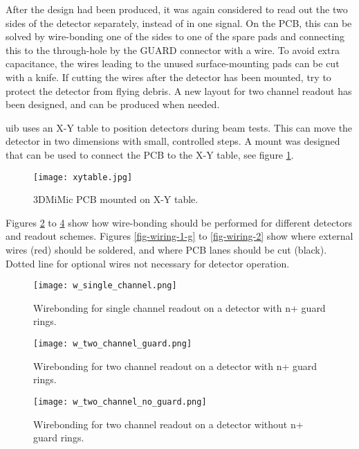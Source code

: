 \documentclass[../main/thesis.tex]{subfiles}
\begin{document}
After the design had been produced, it was again considered to read out the two sides of the detector separately, instead of in one signal. On the \gls{PCB}, this can be solved by wire-bonding one of the sides to one of the spare pads and connecting this to the through-hole by the GUARD connector with a wire. To avoid extra capacitance, the wires leading to the unused surface-mounting pads can be cut with a knife. If cutting the wires after the detector has been mounted, try to protect the detector from flying debris. A new layout for two channel readout has been designed, and can be produced when needed. 

\gls{uib} uses an X-Y table to position detectors during beam tests. This can move the detector in two dimensions with small, controlled steps. A mount was designed that can be used to connect the PCB to the X-Y table, see figure \ref{fig-xytable-picture}. 

\begin{figure}[h]
	\centering
	\texttt{[image: xytable.jpg]}
	\caption{3DMiMic PCB mounted on X-Y table.}
	\label{fig-xytable-picture}
\end{figure} 

Figures \ref{fig-wire-1-g} to \ref{fig-wire-2} show how wire-bonding should be performed for different detectors and readout schemes. Figures \ref{fig-wiring-1-g} to \ref{fig-wiring-2} show where external wires (red) should be soldered, and where PCB lanes should be cut (black). Dotted line for optional wires not necessary for detector operation.

\begin{figure}%
	\centering
	\texttt{[image: w\_single\_channel.png]}
	\caption{Wirebonding for single channel readout on a detector with n+ guard rings.}
	\label{fig-wire-1-g} 
\end{figure}

\begin{figure}%
	\centering
	\texttt{[image: w\_two\_channel\_guard.png]}
	\caption{Wirebonding for two channel readout on a detector with n+ guard rings.}
	\label{fig-wire-2-g} 
\end{figure}

\begin{figure}%
	\centering
	\texttt{[image: w\_two\_channel\_no\_guard.png]}
	\caption{Wirebonding for two channel readout on a detector without n+ guard rings.}
	\label{fig-wire-2} 
\end{figure}
\end{document}
